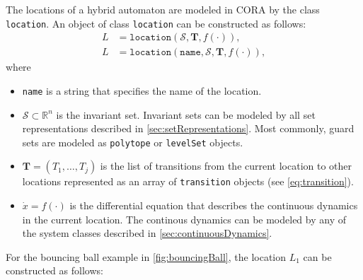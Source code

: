 \begin{center}
    \begin{minipage}[t]{0.1\textwidth}
        \vspace{10pt}
    \end{minipage}
    \begin{minipage}[t]{0.8\textwidth}
        \footnotesize
        
    \end{minipage}
\end{center}

\vspace{1cm}

The locations of a hybrid automaton are modeled in CORA by the class \texttt{location}. An object of class \texttt{location} can be constructed as follows:
\begin{equation}
    \begin{split}
        L &= \texttt{location}(\mathcal{S},\mathbf{T},f(\cdot)), \\
        L &= \texttt{location}(\texttt{name},\mathcal{S},\mathbf{T},f(\cdot)),
    \end{split}
    \label{eq:location}
\end{equation}
where
\begin{itemize}
    \item \texttt{name} is a string that specifies the name of the location.
    \item $\mathcal{S} \subset \mathbb{R}^n$ is the invariant set. Invariant sets can be modeled by all set representations described in \cref{sec:setRepresentations}. Most commonly, guard sets are modeled as \texttt{polytope} or \texttt{levelSet} objects.
    \item $\mathbf{T} = (T_1,\dots,T_j)$ is the list of transitions from the current location to other locations represented as an array of \texttt{transition} objects (see \eqref{eq:transition}).
    \item $\dot{x} = f(\cdot)$ is the differential equation that describes the continuous dynamics in the current location. The continous dynamics can be modeled by any of the system classes described in \cref{sec:continuousDynamics}.
\end{itemize}

For the bouncing ball example in \cref{fig:bouncingBall}, the location $L_1$ can be constructed as follows:

\begin{center}
    \begin{minipage}[t]{0.1\textwidth}
        \vspace{10pt}
    \end{minipage}
    \begin{minipage}[t]{0.8\textwidth}
        \footnotesize
        
    \end{minipage}
\end{center}

\vspace{1cm}



